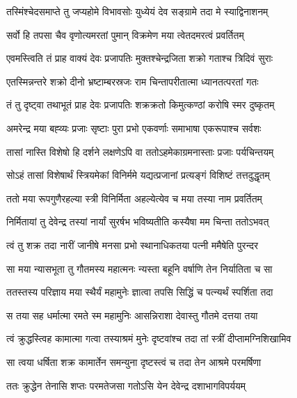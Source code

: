 \twolineshloka
{तस्मिंश्चेदसमाप्ते तु जप्यहोमे विभावसोः}
{युध्येयं देव सङ्ग्रामे तदा मे स्याद्विनाशनम्} %

\twolineshloka
{सर्वो हि तपसा चैव वृणोत्यमरतां पुमान्}
{विक्रमेण मया त्वेतदमरत्वं प्रवर्तितम्} %

\twolineshloka
{एवमस्त्विति तं प्राह वाक्यं देवः प्रजापतिः}
{मुक्तश्चेन्द्रजिता शक्रो गताश्च त्रिदिवं सुराः} %

\twolineshloka
{एतस्मिन्नन्तरे शक्रो दीनो भ्रष्टाम्बरस्रजः}
{राम चिन्तापरीतात्मा ध्यानतत्परतां गतः} %

\twolineshloka
{तं तु दृष्ट्वा तथाभूतं प्राह देवः प्रजापतिः}
{शक्रक्रतो किमुत्कण्ठां करोषि स्मर दुष्कृतम्} %

\twolineshloka
{अमरेन्द्र मया बह्व्यः प्रजाः सृष्टाः पुरा प्रभो}
{एकवर्णाः समाभाषा एकरूपाश्च सर्वशः} %

\twolineshloka
{तासां नास्ति विशेषो हि दर्शने लक्षणेऽपि वा}
{ततोऽहमेकाग्रमनास्ताः प्रजाः पर्यचिन्तयम्} %

\twolineshloka
{सोऽहं तासां विशेषार्थं स्त्रियमेकां विनिर्ममे}
{यद्यत्प्रजानां प्रत्यङ्गं विशिष्टं तत्तदुद्धृतम्} %

\twolineshloka
{ततो मया रूपगुणैरहल्या स्त्री विनिर्मिता}
{अहल्येत्येव च मया तस्या नाम प्रवर्तितम्} %

\twolineshloka
{निर्मितायां तु देवेन्द्र तस्यां नार्यां सुरर्षभ}
{भविष्यतीति कस्यैषा मम चिन्ता ततोऽभवत्} %

\twolineshloka
{त्वं तु शक्र तदा नारीं जानीषे मनसा प्रभो}
{स्थानाधिकतया पत्नी ममैषेति पुरन्दर} %

\twolineshloka
{सा मया न्यासभूता तु गौतमस्य महात्मनः}
{न्यस्ता बहूनि वर्षाणि तेन निर्यातिता च सा} %

\twolineshloka
{ततस्तस्य परिज्ञाय मया स्थैर्यं महामुनेः}
{ज्ञात्वा तपसि सिद्धिं च पत्न्यर्थं स्पर्शिता तदा} %

\twolineshloka
{स तया सह धर्मात्मा रमते स्म महामुनिः}
{आसन्निराशा देवास्तु गौतमे दत्तया तया} %

\twolineshloka
{त्वं क्रुद्धस्त्विह कामात्मा गत्वा तस्याश्रमं मुनेः}
{दृष्टवांश्च तदा तां स्त्रीं दीप्तामग्निशिखामिव} %

\twolineshloka
{सा त्वया धर्षिता शक्र कामार्तेन समन्युना}
{दृष्टस्त्वं च तदा तेन आश्रमे परमर्षिणा} %

\twolineshloka
{ततः क्रुद्धेन तेनासि शप्तः परमतेजसा}
{गतोऽसि येन देवेन्द्र दशाभागविपर्ययम्} %

